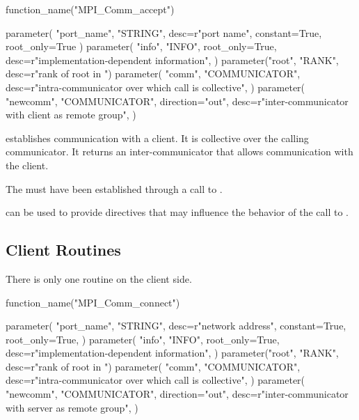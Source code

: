 \begin{mpi-binding}
    function_name("MPI_Comm_accept")

    parameter(
        "port_name", "STRING", desc=r"port name", constant=True, root_only=True
    )
    parameter(
        "info",
        "INFO",
        root_only=True,
        desc=r"implementation-dependent information",
    )
    parameter("root", "RANK", desc=r"rank of root in ")
    parameter(
        "comm",
        "COMMUNICATOR",
        desc=r"intra-communicator over which call is collective",
    )
    parameter(
        "newcomm",
        "COMMUNICATOR",
        direction="out",
        desc=r"inter-communicator with client as remote group",
    )
\end{mpi-binding}

 establishes communication with a client.
It is collective over the calling communicator. It returns an
inter-communicator that allows communication with the client.

The  must have been established
through a call to .


 can be used to provide directives that may influence the behavior
of the call to .





\subsection{Client Routines}


There is only one routine on the client side.

\begin{mpi-binding}
    function_name("MPI_Comm_connect")

    parameter(
        "port_name",
        "STRING",
        desc=r"network address",
        constant=True,
        root_only=True,
    )
    parameter(
        "info",
        "INFO",
        root_only=True,
        desc=r"implementation-dependent information",
    )
    parameter("root", "RANK", desc=r"rank of root in ")
    parameter(
        "comm",
        "COMMUNICATOR",
        desc=r"intra-communicator over which call is collective",
    )
    parameter(
        "newcomm",
        "COMMUNICATOR",
        direction="out",
        desc=r"inter-communicator with server as remote group",
    )
\end{mpi-binding}

